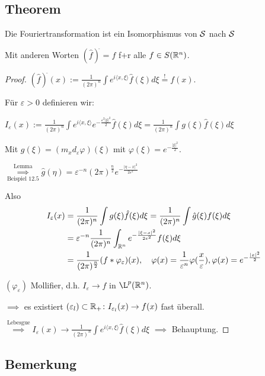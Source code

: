 \subsection{Theorem}

Die Fouriertransformation ist ein Isomorphismus von $\mathcal{S}$ nach $\mathcal{S}$

Mit anderen Worten $(\hat f)^{\check{}} = f$ f+r alle $f \in S(\mathbb{R}^n)$.

\begin{proof}
  $(\hat f)^{\check{}} (x) := \frac{1}{(2\pi)^n} \int e^{i \langle x, \xi \rangle} \hat f(\xi) d\xi \overset{!}{=} f(x)$.

  Für $\varepsilon > 0$ definieren wir:

  $I_\varepsilon(x) := \frac{1}{(2\pi)^n} \int e^{i\langle x, \xi \rangle} e^{-\frac{\varepsilon^2 |\xi|^2}{2}} \hat f(\xi) d\xi
  = \frac{1}{(2\pi)^n} \int g(\xi)  \hat f(\xi) d\xi$

  Mit $g(\xi) = (m_x d_\varepsilon \varphi) (\xi)$ mit $\varphi(\xi) = e^{-\frac{|\xi|^2}{2}}$.

  $\underset{\text{Beispiel 12.5}}{\overset{\text{Lemma}}{\implies}} \hat g(\eta) = \varepsilon^{-n} (2\pi)^{\frac{n}{2}} e^{-\frac{|\eta - x|^2}{2\varepsilon^2}}$

  Also 
  \begin{align*}
    I_\varepsilon(x) 
    &= \frac{1}{(2\pi)^n} \int g(\xi) \hat f(\xi) d\xi = \frac{1}{(2\pi)^n} \int \hat g(\xi) f(\xi) d\xi \\
    &= \varepsilon^{-n} \frac{1}{(2\pi)^n} \int_{\mathbb{R}^n} e^{-\frac{|\xi - x|^2}{2 \varepsilon^2}} f(\xi) d\xi \\
    &= \frac{1}{(2\pi)^{\frac{n}{2}}} (f\ast \varphi_\varepsilon)(x), \quad \varphi(x) = \frac{1}{\varepsilon^n} \varphi(\frac{x}{\varepsilon}), \varphi(x) = e^{-\frac{|x|^2}{2}}
  \end{align*}

  $(\varphi_\varepsilon)$ Mollifier, d.h.  $I_\varepsilon \to f$ in $\L^p(\R^n)$.

  $\implies$ es existiert $(\varepsilon_l) \subset \mathbb{R}_+ \colon I_{\varepsilon_l}(x) \to f(x)$ fast überall.

  $\overset{\text{Lebesgue}}{\implies} I_\varepsilon(x) \to \frac{1}{(2\pi)^n} \int e^{i\langle x, \xi \rangle} \hat f(\xi) d\xi$ $\implies$ Behauptung.
\end{proof}

\subsection{Bemerkung}

